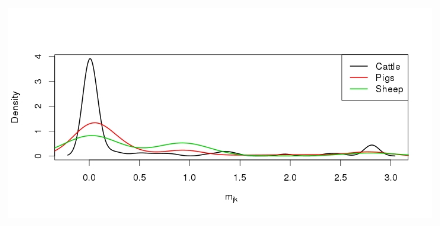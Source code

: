 \documentclass[10pt]{article}
\begin{document}
\begin{figure}[!ht]
\begin{center}
\end{center}
\caption{}
\label{fig:migration}
\end{figure}
\newpage
\setcounter{figure}{0}
\begin{figure}[!ht]
\begin{center}
\includegraphics[scale=.5]{FIGURES/trade_info.jpeg}
\end{center}
\caption{}
\label{sfig:tradeinfo}
\end{figure}
\end{document}
